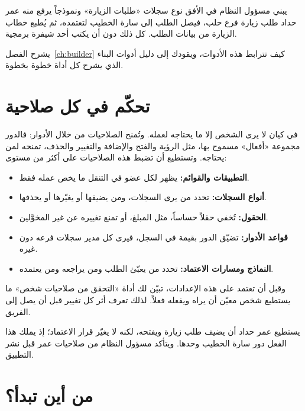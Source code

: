 \begin{rcnote}
يبني مسؤول النظام في الأفق نوع سجلات «طلبات الزيارة» ونموذجاً يرفع منه عمر حداد طلب زيارة فرع حلب، فيصل الطلب إلى سارة الخطيب لتعتمده، ثم يُطبع خطاب الزيارة من بيانات الطلب. كل ذلك دون أن يكتب أحد شيفرة برمجية.
\end{rcnote}

يشرح الفصل~\ref{ch:builder} كيف تترابط هذه الأدوات، ويقودك إلى دليل أدوات البناء الذي يشرح كل أداة خطوة بخطوة.

\section{تحكّم في كل صلاحية}
\label{sec:intro-control}

في كيان لا يرى الشخص إلا ما يحتاجه لعمله. وتُمنح الصلاحيات من خلال الأدوار: فالدور مجموعة «أفعال» مسموح بها، مثل الرؤية والفتح والإضافة والتغيير والحذف، تمنحه لمن يحتاجه. وتستطيع أن تضبط هذه الصلاحيات على أكثر من مستوى:

\begin{itemize}
  \item \textbf{التطبيقات والقوائم:} يظهر لكل عضو في التنقل ما يخص عمله فقط.
  \item \textbf{أنواع السجلات:} تحدد من يرى السجلات، ومن يضيفها أو يغيّرها أو يحذفها.
  \item \textbf{الحقول:} تُخفي حقلاً حساساً، مثل المبلغ، أو تمنع تغييره عن غير المخوَّلين.
  \item \textbf{قواعد الأدوار:} تضيّق الدور بقيمة في السجل، فيرى كل مدير سجلات فرعه دون غيره.
  \item \textbf{النماذج ومسارات الاعتماد:} تحدد من يعبّئ الطلب ومن يراجعه ومن يعتمده.
\end{itemize}

وقبل أن تعتمد على هذه الإعدادات، تبيّن لك أداة «التحقق من صلاحيات شخص» ما يستطيع شخص معيّن أن يراه ويفعله فعلاً. لذلك تعرف أثر كل تغيير قبل أن يصل إلى الفريق.

\begin{rcnote}
يستطيع عمر حداد أن يضيف طلب زيارة ويفتحه، لكنه لا يغيّر قرار الاعتماد؛ إذ يملك هذا الفعل دور سارة الخطيب وحدها. ويتأكد مسؤول النظام من صلاحيات عمر قبل نشر التطبيق.
\end{rcnote}

\section{من أين تبدأ؟}

